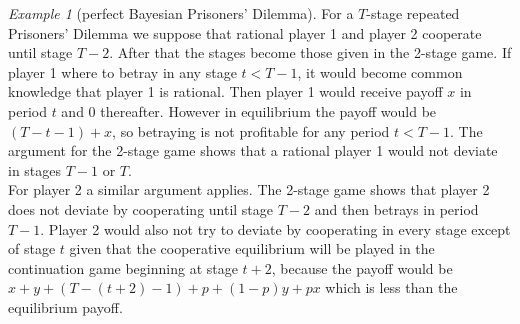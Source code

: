 \documentclass[a4paper, 12pt]{article}
\theoremstyle{plain}
\theoremstyle{definition}
\theoremstyle{lemma}
\theoremstyle{remark}
\theoremstyle{corollary}
\theoremstyle{example}
\newtheorem{example}[theorem]{Example}
\begin{document}
\begin{example}[perfect Bayesian Prisoners' Dilemma]
		For a $T$-stage repeated Prisoners' Dilemma we suppose that rational player 1 and player 2 cooperate until stage $T-2$. After that the stages become those given in the 2-stage game. If player 1 where to betray in any stage $t<T-1$, it would become common knowledge that player 1 is rational. Then player 1 would receive payoff $x$ in period $t$ and $0$ thereafter. However in equilibrium the payoff would be $(T-t-1)+x$, so betraying is not profitable for any period $t<T-1$. The argument for the 2-stage game shows that a rational player 1 would not deviate in stages $T-1$ or $T$.\\
		For player 2 a similar argument applies. The 2-stage game shows that player 2 does not deviate by cooperating until stage $T-2$ and then betrays in period $T-1$. Player 2 would also not try to deviate by cooperating in every stage except of stage $t$ given that the cooperative equilibrium will be played in the continuation game beginning at stage $t+2$, because the payoff would be $x+y+(T-(t+2)-1)+p+(1-p)y+px$ which is less than the equilibrium payoff.
	\end{example}
\end{document}
